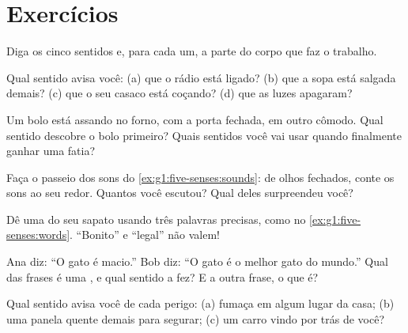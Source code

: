 \section{Exercícios}

\begin{exercise}[$\star$]\label{exo:g1:five-senses:1}
Diga os cinco sentidos e, para cada um, a parte do corpo que faz o
trabalho.
\end{exercise}

\begin{exercise}[$\star$]\label{exo:g1:five-senses:2}
Qual sentido avisa você: (a) que o rádio está ligado? (b) que a sopa
está salgada demais? (c) que o seu casaco está coçando? (d) que as
luzes apagaram?
\end{exercise}

\begin{exercise}[$\star$]\label{exo:g1:five-senses:3}
Um bolo está assando no forno, com a porta fechada, em outro cômodo.
Qual sentido descobre o bolo primeiro? Quais sentidos você vai usar
quando finalmente ganhar uma fatia?
\end{exercise}

\begin{exercise}[$\star$]\label{exo:g1:five-senses:4}
Faça o passeio dos sons do \cref{ex:g1:five-senses:sounds}: de olhos
fechados, conte os sons ao seu redor. Quantos você escutou? Qual
deles surpreendeu você?
\end{exercise}

\begin{exercise}[$\star$]\label{exo:g1:five-senses:5}
Dê uma  do seu sapato usando três palavras precisas,
como no \cref{ex:g1:five-senses:words}. ``Bonito'' e ``legal'' não
valem!
\end{exercise}

\begin{exercise}[$\star$]\label{exo:g1:five-senses:6}
Ana diz: ``O gato é macio.'' Bob diz: ``O gato é o melhor gato do
mundo.'' Qual das frases é uma , e qual sentido a fez? E
a outra frase, o que é?
\end{exercise}

\begin{exercise}[$\star$]\label{exo:g1:five-senses:7}
Qual sentido avisa você de cada perigo: (a) fumaça em algum lugar da
casa; (b) uma panela quente demais para segurar; (c) um carro vindo
por trás de você?
\end{exercise}


